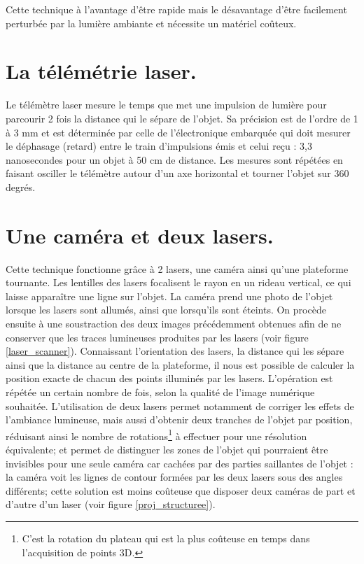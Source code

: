 \documentclass[a4paper,10pt]{report}
\begin{document}
Cette technique à l’avantage d’être rapide mais le désavantage d’être facilement perturbée par la lumière ambiante et nécessite un matériel coûteux.

\section{La télémétrie laser.}
Le télémètre laser mesure le temps que met une impulsion de lumière pour parcourir 2 fois la distance qui le sépare de l'objet. Sa précision est de l'ordre de 1 à 3 mm et est déterminée par celle de l'électronique embarquée qui doit mesurer le déphasage (retard) entre le train d'impulsions émis et celui reçu : 3,3 nanosecondes pour un objet à 50 cm de distance. Les mesures sont répétées en faisant osciller le télémètre autour d'un axe horizontal et tourner l'objet sur 360 degrés.

\section{Une caméra et deux lasers.}
Cette technique fonctionne grâce à 2 lasers, une caméra ainsi qu’une plateforme tournante. Les lentilles des lasers focalisent le rayon en un rideau vertical, ce qui laisse apparaître une ligne sur l’objet. La caméra prend une photo de l’objet lorsque les lasers sont allumés, ainsi que lorsqu’ils sont éteints. On procède ensuite à une soustraction des deux images précédemment obtenues afin de ne conserver que les traces lumineuses
produites par les lasers (voir figure \ref{laser_scanner}). Connaissant l’orientation des lasers, la distance qui les sépare ainsi que la distance au centre de la plateforme, il nous est possible de calculer la position exacte de chacun des points illuminés par les lasers. L’opération est répétée un certain nombre de fois, selon la qualité de l’image numérique souhaitée. L'utilisation de deux lasers permet notamment de corriger les effets de l'ambiance lumineuse, mais aussi d'obtenir deux tranches de l'objet par position, réduisant ainsi le nombre de rotations\footnote{C'est la rotation du plateau qui est la plus coûteuse en temps dans l'acquisition de points 3D.} à effectuer pour une résolution équivalente; et permet \cite{dsls} de distinguer les zones de l'objet qui pourraient être invisibles pour une seule caméra car cachées par des parties saillantes de l'objet : la caméra voit les lignes de contour formées par les deux lasers sous des angles différents; cette solution est moins coûteuse que disposer deux caméras de part et d'autre d'un laser (voir figure \ref{proj_structuree}).
\end{document}
